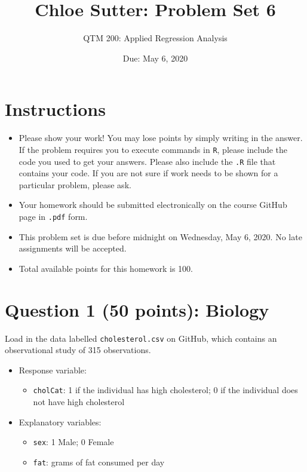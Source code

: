 \documentclass[12pt,letterpaper]{article}
\title{Chloe Sutter: Problem Set 6}
\date{Due: May 6, 2020}
\author{QTM 200: Applied Regression Analysis}
\begin{document}
	\maketitle
	
	\section*{Instructions}
	\begin{itemize}
		\item Please show your work! You may lose points by simply writing in the answer. If the problem requires you to execute commands in \texttt{R}, please include the code you used to get your answers. Please also include the \texttt{.R} file that contains your code. If you are not sure if work needs to be shown for a particular problem, please ask.
		\item Your homework should be submitted electronically on the course GitHub page in \texttt{.pdf} form.
		\item This problem set is due before midnight on Wednesday, May 6, 2020. No late assignments will be accepted.
		\item Total available points for this homework is 100.
	\end{itemize}
	
	\vspace{.5cm}
	
\section*{Question 1 (50 points): Biology}
\vspace{.25cm}
\noindent Load in the data labelled \texttt{cholesterol.csv} on GitHub, which contains an observational study of 315 observations.

  

\begin{itemize}
	\item
	Response variable: 
	\begin{itemize}
		\item \texttt{cholCat}: 1 if the individual has high cholesterol; 0 if the individual does not have high cholesterol
	\end{itemize}
	\item
	Explanatory variables: 
	\begin{itemize}
		\item
		\texttt{sex}: 1 Male; 0 Female
		\item
		\texttt{fat}: grams of fat consumed per day
		
	\end{itemize}
	
\end{itemize}
\end{document}
